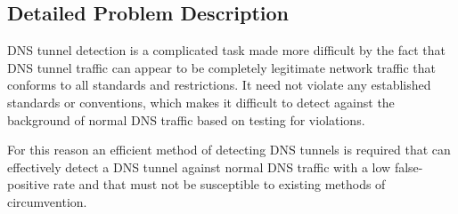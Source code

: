 \documentclass{llncs}
\begin{document}

\subsection{Detailed Problem Description}

DNS tunnel detection is a complicated
task made more difficult by the fact that DNS tunnel traffic can appear to be completely
legitimate network traffic that conforms to all standards and restrictions. It
need not violate any established standards or conventions, which makes it
difficult to detect against the background of normal DNS traffic based on
testing for violations.

For this reason an efficient method of detecting DNS tunnels is required
that can effectively detect a DNS tunnel against normal DNS traffic with a low
false-positive rate and that must not be susceptible to existing methods of
circumvention.

\end{document}
